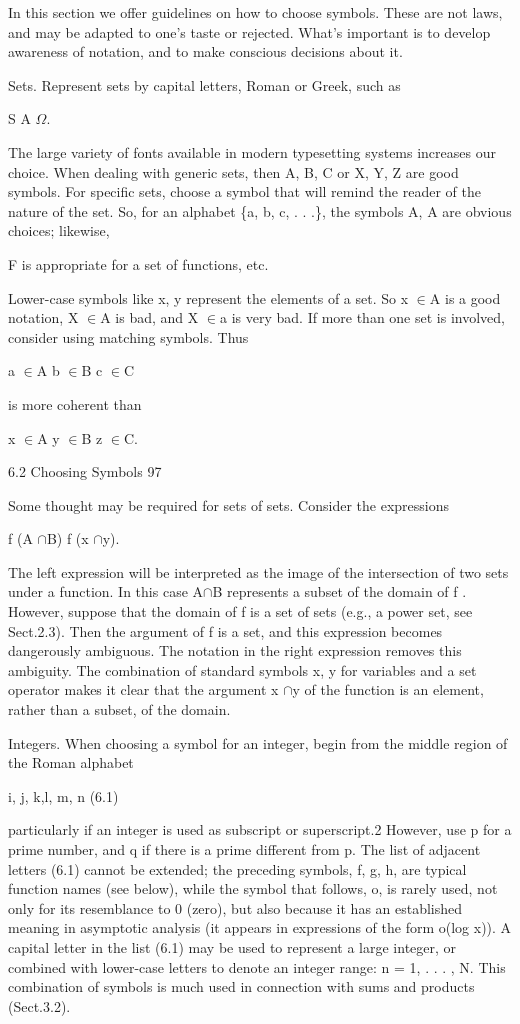 \documentclass[11pt]{article}
\theoremstyle{plain}
\theoremstyle{definition}
\begin{document}
In this section we offer guidelines on how to choose symbols. These are not laws, and may be adapted to one's taste or rejected. What's important is to develop awareness of notation, and to make conscious decisions about it.

Sets. Represent sets by capital letters, Roman or Greek, such as

S A $\Omega$.

The large variety of fonts available in modern typesetting systems increases our choice. When dealing with generic sets, then A, B, C or X, Y, Z are good symbols. For specific sets, choose a symbol that will remind the reader of the nature of the set. So, for an alphabet \{a, b, c, . . .\}, the symbols A, A are obvious choices; likewise,

F is appropriate for a set of functions, etc.

Lower-case symbols like x, y represent the elements of a set. So x $\in$A is a good notation, X $\in$A is bad, and X $\in$a is very bad. If more than one set is involved, consider using matching symbols. Thus

a $\in$A b $\in$B c $\in$C

is more coherent than

x $\in$A y $\in$B z $\in$C.

6.2 Choosing Symbols 97

Some thought may be required for sets of sets. Consider the expressions

f (A $\cap$B) f (x $\cap$y).

The left expression will be interpreted as the image of the intersection of two sets under a function. In this case A$\cap$B represents a subset of the domain of f . However, suppose that the domain of f is a set of sets (e.g., a power set, see Sect.2.3). Then the argument of f is a set, and this expression becomes dangerously ambiguous. The notation in the right expression removes this ambiguity. The combination of standard symbols x, y for variables and a set operator makes it clear that the argument x $\cap$y of the function is an element, rather than a subset, of the domain.

Integers. When choosing a symbol for an integer, begin from the middle region of the Roman alphabet

i, j, k,l, m, n (6.1)

particularly if an integer is used as subscript or superscript.2 However, use p for a prime number, and q if there is a prime different from p. The list of adjacent letters (6.1) cannot be extended; the preceding symbols, f, g, h, are typical function names (see below), while the symbol that follows, o, is rarely used, not only for its resemblance to 0 (zero), but also because it has an established meaning in asymptotic analysis (it appears in expressions of the form o(log x)). A capital letter in the list (6.1) may be used to represent a large integer, or combined with lower-case letters to denote an integer range: n = 1, . . . , N. This combination of symbols is much used in connection with sums and products (Sect.3.2).
\end{document}
